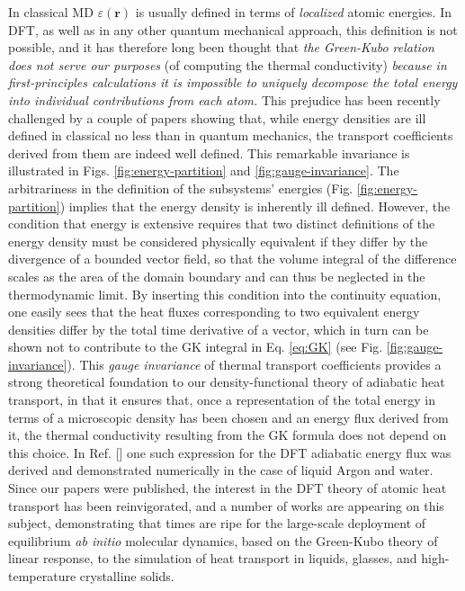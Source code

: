 In classical MD $\varepsilon(\mathbf{r})$ is usually defined in terms of \emph{localized} atomic energies.\cite{Irving1950} In DFT, as well as in any other quantum mechanical approach, this definition is not possible, and it has therefore long been thought that \emph{the Green-Kubo relation does not serve our purposes} (of computing the thermal conductivity) \emph{because in first-principles calculations it is impossible to uniquely decompose the total energy into individual contributions from each atom.}\cite{Stackhouse2010b} This prejudice has been recently challenged by a couple of papers showing that, while energy densities are ill defined in classical no less than in quantum mechanics, the transport coefficients derived from them are indeed well defined.\cite{Marcolongo2016,Ercole2016} This remarkable invariance is illustrated in Figs. \ref{fig:energy-partition} and \ref{fig:gauge-invariance}. The arbitrariness in the definition of the subsystems' energies (Fig. \ref{fig:energy-partition}) implies that the energy density is inherently ill defined. However, the condition that energy is extensive requires that two distinct definitions of the energy density must be considered physically equivalent if they differ by the divergence of a bounded vector field, so that the volume integral of the difference scales as the area of the domain boundary and can thus be neglected in the thermodynamic limit. By inserting this condition into the continuity equation, one easily sees that the heat fluxes corresponding to two equivalent energy densities differ by the total time derivative of a vector, which in turn can be shown not to contribute to the GK integral in Eq. \eqref{eq:GK} (see Fig. \ref{fig:gauge-invariance}).\cite{Marcolongo2016,Ercole2016} This \emph{gauge invariance} of thermal transport coefficients provides a strong theoretical foundation to our density-functional theory of adiabatic heat transport,\cite{Marcolongo2016} in that it ensures that, once a representation of the total energy in terms of a microscopic density has been chosen and an energy flux derived from it, the thermal conductivity resulting from the GK formula does not depend on this choice. In Ref. [] one such expression for the DFT adiabatic energy flux was derived and demonstrated numerically in the case of liquid Argon and water. Since our papers were published, the interest in the DFT theory of atomic heat transport has been reinvigorated, and a number of works are appearing on this subject, \cite{Carbogno:2017gc,Kang2017} demonstrating that times are ripe for the large-scale deployment of equilibrium \emph{ab initio} molecular dynamics, based on the Green-Kubo theory of linear response, to the simulation of heat transport in liquids, glasses, and high-temperature crystalline solids.

